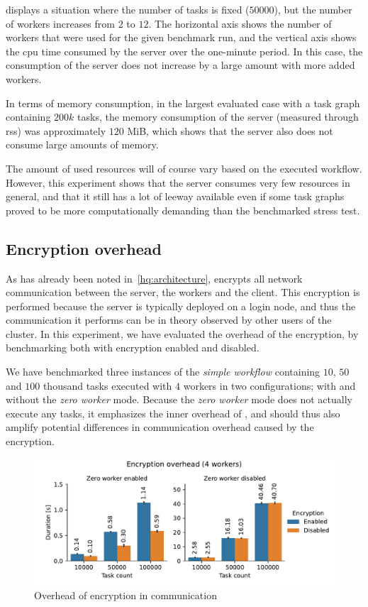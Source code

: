  displays a situation where the number of tasks
is fixed ($50000$), but the number of workers increases from
$2$ to $12$. The horizontal axis shows the number of workers
that were used for the given benchmark run, and the vertical axis shows the \gls{cpu}
time consumed by the server over the one-minute period. In this case, the consumption of the server
does not increase by a large amount with more added workers.

In terms of memory consumption, in the largest evaluated case with a task graph containing
$200k$ tasks, the memory consumption of the server (measured through
\gls{rss}) was approximately $120$ MiB, which shows that the server
also does not consume large amounts of memory.

The amount of used resources will of course vary based on the executed workflow. However, this
experiment shows that the server consumes very few resources in general, and that it still has a
lot of leeway available even if some task graphs proved to be more computationally demanding than
the benchmarked stress test.

\subsection{Encryption overhead}
\label{sec:hq-exp-encryption-overhead}
As has already been noted in~\autoref{hq:architecture}, \hyperqueue{} encrypts all network
communication between the server, the workers and the client. This encryption is performed because
the server is typically deployed on a login node, and thus the communication it performs can be in
theory observed by other users of the cluster. In this experiment, we have evaluated the overhead
of the encryption, by benchmarking \hyperqueue{} both with encryption enabled and
disabled.

We have benchmarked three instances of the \emph{simple workflow} containing $10$,
$50$ and $100$ thousand tasks executed with $4$ \hyperqueue{} workers in two configurations;
with and without the \emph{zero worker} mode. Because the \emph{zero worker} mode does not
actually execute any tasks, it emphasizes the inner overhead of \hyperqueue{}, and
should thus also amplify potential differences in communication overhead caused by
the encryption.

\begin{figure}[h]
	\centering
	\includegraphics[width=\textwidth]{imgs/hq/charts/encryption-overhead}
	\caption{Overhead of encryption in \hyperqueue{} communication}
	\label{fig:hq-encryption-overhead}
\end{figure}

